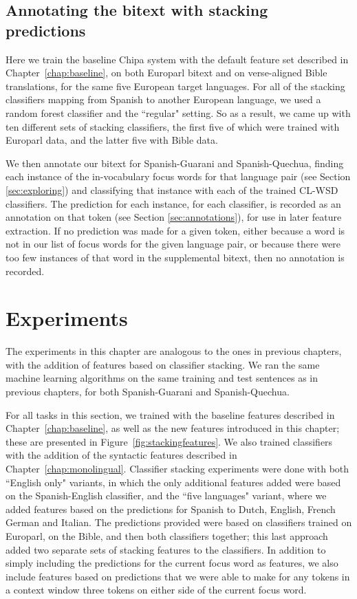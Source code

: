 \subsection{Annotating the bitext with stacking predictions}

Here we train the baseline Chipa system with the default feature set described
in Chapter~\ref{chap:baseline}, on both Europarl bitext and on verse-aligned
Bible translations, for the same five European target languages. For all of
the stacking classifiers mapping from Spanish to another European language, we
used a random forest classifier and the ``regular" setting. So as a result, we
came up with ten different sets of stacking classifiers, the first five of
which were trained with Europarl data, and the latter five with Bible data.

We then annotate our bitext for Spanish-Guarani and Spanish-Quechua, finding
each instance of the in-vocabulary focus words for that language pair (see
Section \ref{sec:exploring}) and classifying that instance with each of the
trained CL-WSD classifiers. The prediction for each instance, for each
classifier, is recorded as an annotation on that token (see Section
\ref{sec:annotations}), for use in later feature extraction. If no prediction
was made for a given token, either because a word is not in our list of focus
words for the given language pair, or because there were too few instances of
that word in the supplemental bitext, then no annotation is recorded.

\section{Experiments}
\label{sec:multilingual-experiments}

The experiments in this chapter are analogous to the ones in previous chapters,
with the addition of features based on classifier stacking. We ran the same
machine learning algorithms on the same training and test sentences as in
previous chapters, for both Spanish-Guarani and Spanish-Quechua.

For all tasks in this section, we trained with the baseline features described
in Chapter~\ref{chap:baseline}, as well as the new features introduced in this
chapter; these are presented in Figure~\ref{fig:stackingfeatures}.  We also
trained classifiers with the addition of the syntactic features described in
Chapter~\ref{chap:monolingual}. Classifier stacking experiments were done with
both ``English only" variants, in which the only additional features added were
based on the Spanish-English classifier, and the ``five languages" variant,
where we added features based on the predictions for Spanish to Dutch, English,
French German and Italian. The predictions provided were based on classifiers
trained on Europarl, on the Bible, and then both classifiers together; this
last approach added two separate sets of stacking features to the classifiers.
In addition to simply including the predictions for the current focus word as
features, we also include features based on predictions that we were able to
make for any tokens in a context window three tokens on either side of the
current focus word.


